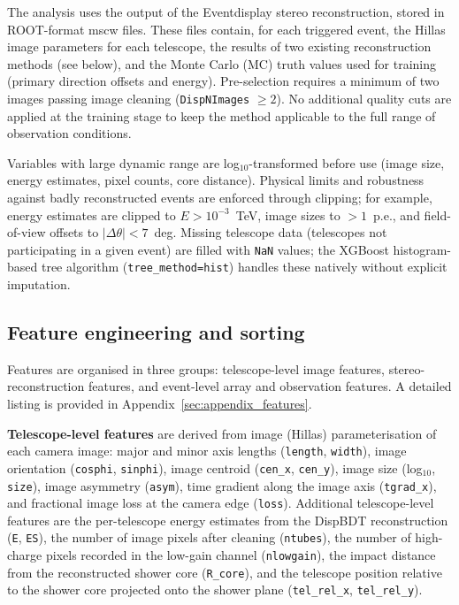 \documentclass[12pt]{article}
\begin{document}
The analysis uses the output of the Eventdisplay stereo reconstruction,
stored in ROOT-format mscw files.
These files contain, for each triggered event, the
Hillas image parameters for each telescope, the results of two
existing reconstruction methods (see below), and the Monte Carlo (MC) truth values
used for training (primary direction offsets and energy).
Pre-selection requires a minimum of two images passing image cleaning
(\texttt{DispNImages} $\geq 2$).
No additional quality cuts are applied at the training stage to keep the
method applicable to the full range of observation conditions.

Variables with large dynamic range are log$_{10}$-transformed before use
(image size, energy estimates, pixel counts, core distance).
Physical limits and robustness against badly reconstructed events are
enforced through clipping; for example, energy estimates are clipped to
$E > 10^{-3}$~TeV, image sizes to $> 1$~p.e., and field-of-view offsets
to $|\Delta\theta| < 7$~deg.
Missing telescope data (telescopes not participating in a given event)
are filled with \texttt{NaN} values; the XGBoost
histogram-based tree algorithm (\texttt{tree\_method=hist}) handles
these natively without explicit imputation.

\subsection{Feature engineering and sorting}
\label{sec:features}

Features are organised in three groups: telescope-level image features,
stereo-reconstruction features, and event-level array and observation features.
A detailed listing is provided in Appendix~\ref{sec:appendix_features}.

\textbf{Telescope-level features} are derived from image (Hillas) parameterisation
of each camera image: major and minor axis lengths (\texttt{length}, \texttt{width}),
image orientation (\texttt{cosphi}, \texttt{sinphi}), image centroid
(\texttt{cen\_x}, \texttt{cen\_y}), image size (log$_{10}$, \texttt{size}),
image asymmetry (\texttt{asym}), time gradient along the image axis (\texttt{tgrad\_x}),
and fractional image loss at the camera edge (\texttt{loss}).
Additional telescope-level features are
the per-telescope energy estimates from the DispBDT reconstruction
(\texttt{E}, \texttt{ES}), the number of image pixels after cleaning (\texttt{ntubes}),
the number of high-charge pixels recorded in the low-gain channel (\texttt{nlowgain}),
the impact distance from the reconstructed shower core (\texttt{R\_core}),
and the telescope position relative to the shower core projected onto the shower plane
(\texttt{tel\_rel\_x}, \texttt{tel\_rel\_y}).
\end{document}

